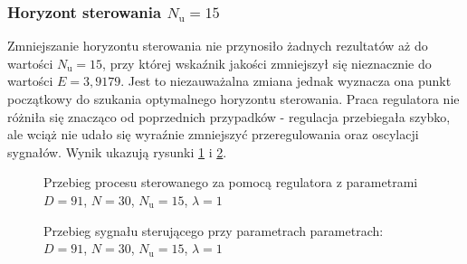 \subsubsection{Horyzont sterowania $N_{\mathrm{u}} = 15$}
Zmniejszanie horyzontu sterowania nie przynosiło żadnych rezultatów aż do wartości $N_{\mathrm{u}} = 15$, przy której wskaźnik jakości zmniejszył się nieznacznie do wartości $E = 3,9179$. Jest to niezauważalna zmiana jednak wyznacza ona punkt początkowy do szukania optymalnego horyzontu sterowania. Praca regulatora nie różniła się znacząco od poprzednich przypadków - regulacja przebiegała szybko, ale wciąż nie udało się wyraźnie zmniejszyć przeregulowania oraz oscylacji sygnałów. Wynik ukazują rysunki \ref{dmc_Nu_15_y} i \ref{dmc_Nu_15_u}.
\\
\begin{figure}[t]
    \centering
    \caption{Przebieg procesu sterowanego za pomocą regulatora z parametrami $D = 91$, $N = 30$, $N_{\mathrm{u}} = 15$, $\lambda = 1$}
    \label{dmc_Nu_15_y}
\end{figure}

\begin{figure}[b]
    \centering
    \caption{Przebieg sygnału sterującego przy parametrach parametrach: $D = 91$, $N = 30$, $N_{\mathrm{u}} = 15$, $\lambda = 1$}
    \label{dmc_Nu_15_u}
\end{figure}


